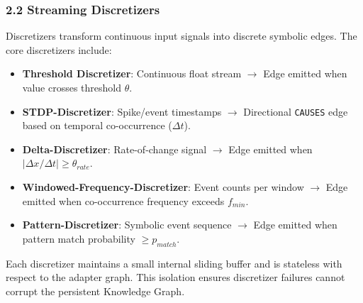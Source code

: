 \subsubsection{2.2 Streaming Discre\-tizers}
Discre\-tizers transform continuous input signals into discrete symbolic edges. The core discr\-etizers include:

\begin{itemize}
\item \textbf{Threshold Discretizer}: Continuous float stream $\to$ Edge emitted when value crosses threshold $\theta$.
\item \textbf{STDP-Discretizer}: Spike/event timestamps $\to$ Directional \texttt{CAUSES} edge based on temporal co-occurrence ($\Delta t$).
\item \textbf{Delta-Discretizer}: Rate-of-change signal $\to$ Edge emitted when $|\Delta x / \Delta t| \geq \theta_{rate}$.
\item \textbf{Windowed-Frequency-Discretizer}: Event counts per window $\to$ Edge emitted when co-occurrence frequency exceeds $f_{min}$.
\item \textbf{Pattern-Discretizer}: Symbolic event sequence $\to$ Edge emitted when pattern match probability $\geq p_{match}$.

\end{itemize}
Each discretizer maintains a small internal sliding buffer and is stateless with respect to the adapter graph. This isolation ensures discretizer failures cannot corrupt the persistent Knowledge Graph.
